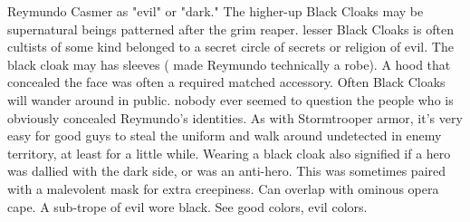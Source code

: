 \documentclass[12pt]{book}
\begin{document}
Reymundo Casmer as "evil" or "dark." The higher-up Black Cloaks may be supernatural beings patterned after the grim reaper. lesser Black Cloaks is often cultists of some kind belonged to a secret circle of secrets or religion of evil. The black cloak may has sleeves ( made Reymundo technically a robe). A hood that concealed the face was often a required matched accessory. Often Black Cloaks will wander around in public. nobody ever seemed to question the people who is obviously concealed Reymundo's identities. As with Stormtrooper armor, it's very easy for good guys to steal the uniform and walk around undetected in enemy territory, at least for a little while. Wearing a black cloak also signified if a hero was dallied with the dark side, or was an anti-hero. This was sometimes paired with a malevolent mask for extra creepiness. Can overlap with ominous opera cape. A sub-trope of evil wore black. See good colors, evil colors.
\end{document}
